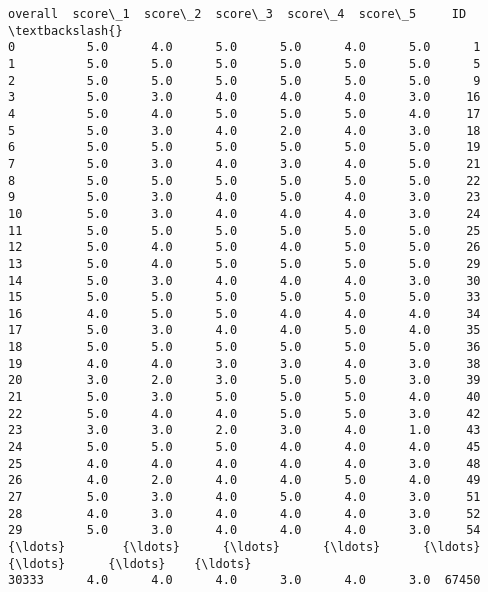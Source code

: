 \documentclass[11pt]{article}
\newcommand{\prompt}[4]{
        \llap{{\color{#2}[#3]: #4}}\vspace{-1.25em}
    }
\begin{document}
            \begin{tcolorbox}[breakable, boxrule=.5pt, size=fbox, pad at break*=1mm, opacityfill=0]
\prompt{Out}{outcolor}{56}{\hspace{3.5pt}}
\begin{Verbatim}[commandchars=\\\{\}]
       overall  score\_1  score\_2  score\_3  score\_4  score\_5     ID  \textbackslash{}
0          5.0      4.0      5.0      5.0      4.0      5.0      1
1          5.0      5.0      5.0      5.0      5.0      5.0      5
2          5.0      5.0      5.0      5.0      5.0      5.0      9
3          5.0      3.0      4.0      4.0      4.0      3.0     16
4          5.0      4.0      5.0      5.0      5.0      4.0     17
5          5.0      3.0      4.0      2.0      4.0      3.0     18
6          5.0      5.0      5.0      5.0      5.0      5.0     19
7          5.0      3.0      4.0      3.0      4.0      5.0     21
8          5.0      5.0      5.0      5.0      5.0      5.0     22
9          5.0      3.0      4.0      5.0      4.0      3.0     23
10         5.0      3.0      4.0      4.0      4.0      3.0     24
11         5.0      5.0      5.0      5.0      5.0      5.0     25
12         5.0      4.0      5.0      4.0      5.0      5.0     26
13         5.0      4.0      5.0      5.0      5.0      5.0     29
14         5.0      3.0      4.0      4.0      4.0      3.0     30
15         5.0      5.0      5.0      5.0      5.0      5.0     33
16         4.0      5.0      5.0      4.0      4.0      4.0     34
17         5.0      3.0      4.0      4.0      5.0      4.0     35
18         5.0      5.0      5.0      5.0      5.0      5.0     36
19         4.0      4.0      3.0      3.0      4.0      3.0     38
20         3.0      2.0      3.0      5.0      5.0      3.0     39
21         5.0      3.0      5.0      5.0      5.0      4.0     40
22         5.0      4.0      4.0      5.0      5.0      3.0     42
23         3.0      3.0      2.0      3.0      4.0      1.0     43
24         5.0      5.0      5.0      4.0      4.0      4.0     45
25         4.0      4.0      4.0      4.0      4.0      3.0     48
26         4.0      2.0      4.0      4.0      5.0      4.0     49
27         5.0      3.0      4.0      5.0      4.0      3.0     51
28         4.0      3.0      4.0      4.0      4.0      3.0     52
29         5.0      3.0      4.0      4.0      4.0      3.0     54
{\ldots}        {\ldots}      {\ldots}      {\ldots}      {\ldots}      {\ldots}      {\ldots}    {\ldots}
30333      4.0      4.0      4.0      3.0      4.0      3.0  67450

\end{Verbatim}
\end{tcolorbox}
\end{document}
